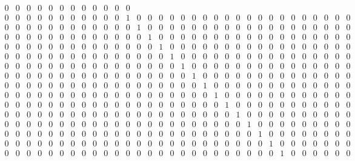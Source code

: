 \documentclass[a4paper]{article}
\begin{document}
\[{\begin{array}{cccccccccccccccccccccccccccccccc}
0 & 0 & 0 & 0 & 0 & 0 & 0 & 0 & 0 & 0 & 0 & 0 \\
0 & 0 & 0 & 0 & 0 & 0 & 0 & 0 & 0 & 0 & 0 & 1 & 0 & 0 & 0 & 0 & 0 & 0 & 0 & 0 &
0 & 0 & 0 & 0 & 0 & 0 & 0 & 0 & 0 & 0 & 0 & 0 \\
0 & 0 & 0 & 0 & 0 & 0 & 0 & 0 & 0 & 0 & 0 & 0 & 1 & 0 & 0 & 0 & 0 & 0 & 0 & 0 &
0 & 0 & 0 & 0 & 0 & 0 & 0 & 0 & 0 & 0 & 0 & 0 \\
0 & 0 & 0 & 0 & 0 & 0 & 0 & 0 & 0 & 0 & 0 & 0 & 0 & 1 & 0 & 0 & 0 & 0 & 0 & 0 &
0 & 0 & 0 & 0 & 0 & 0 & 0 & 0 & 0 & 0 & 0 & 0 \\
0 & 0 & 0 & 0 & 0 & 0 & 0 & 0 & 0 & 0 & 0 & 0 & 0 & 0 & 1 & 0 & 0 & 0 & 0 & 0 &
0 & 0 & 0 & 0 & 0 & 0 & 0 & 0 & 0 & 0 & 0 & 0 \\
0 & 0 & 0 & 0 & 0 & 0 & 0 & 0 & 0 & 0 & 0 & 0 & 0 & 0 & 0 & 1 & 0 & 0 & 0 & 0 &
0 & 0 & 0 & 0 & 0 & 0 & 0 & 0 & 0 & 0 & 0 & 0 \\
0 & 0 & 0 & 0 & 0 & 0 & 0 & 0 & 0 & 0 & 0 & 0 & 0 & 0 & 0 & 0 & 1 & 0 & 0 & 0 &
0 & 0 & 0 & 0 & 0 & 0 & 0 & 0 & 0 & 0 & 0 & 0 \\
0 & 0 & 0 & 0 & 0 & 0 & 0 & 0 & 0 & 0 & 0 & 0 & 0 & 0 & 0 & 0 & 0 & 1 & 0 & 0 &
0 & 0 & 0 & 0 & 0 & 0 & 0 & 0 & 0 & 0 & 0 & 0 \\
0 & 0 & 0 & 0 & 0 & 0 & 0 & 0 & 0 & 0 & 0 & 0 & 0 & 0 & 0 & 0 & 0 & 0 & 1 & 0 &
0 & 0 & 0 & 0 & 0 & 0 & 0 & 0 & 0 & 0 & 0 & 0 \\
0 & 0 & 0 & 0 & 0 & 0 & 0 & 0 & 0 & 0 & 0 & 0 & 0 & 0 & 0 & 0 & 0 & 0 & 0 & 1 &
0 & 0 & 0 & 0 & 0 & 0 & 0 & 0 & 0 & 0 & 0 & 0 \\
0 & 0 & 0 & 0 & 0 & 0 & 0 & 0 & 0 & 0 & 0 & 0 & 0 & 0 & 0 & 0 & 0 & 0 & 0 & 0 &
1 & 0 & 0 & 0 & 0 & 0 & 0 & 0 & 0 & 0 & 0 & 0 \\
0 & 0 & 0 & 0 & 0 & 0 & 0 & 0 & 0 & 0 & 0 & 0 & 0 & 0 & 0 & 0 & 0 & 0 & 0 & 0 &
0 & 1 & 0 & 0 & 0 & 0 & 0 & 0 & 0 & 0 & 0 & 0 \\
0 & 0 & 0 & 0 & 0 & 0 & 0 & 0 & 0 & 0 & 0 & 0 & 0 & 0 & 0 & 0 & 0 & 0 & 0 & 0 &
0 & 0 & 1 & 0 & 0 & 0 & 0 & 0 & 0 & 0 & 0 & 0 \\
0 & 0 & 0 & 0 & 0 & 0 & 0 & 0 & 0 & 0 & 0 & 0 & 0 & 0 & 0 & 0 & 0 & 0 & 0 & 0 &
0 & 0 & 0 & 1 & 0 & 0 & 0 & 0 & 0 & 0 & 0 & 0 \\
0 & 0 & 0 & 0 & 0 & 0 & 0 & 0 & 0 & 0 & 0 & 0 & 0 & 0 & 0 & 0 & 0 & 0 & 0 & 0 &
0 & 0 & 0 & 0 & 1 & 0 & 0 & 0 & 0 & 0 & 0 & 0 \\
0 & 0 & 0 & 0 & 0 & 0 & 0 & 0 & 0 & 0 & 0 & 0 & 0 & 0 & 0 & 0 & 0 & 0 & 0 & 0 &
0 & 0 & 0 & 0 & 0 & 1 & 0 & 0 & 0 & 0 & 0 & 0 \\

\end{array}}\]
\end{document}
